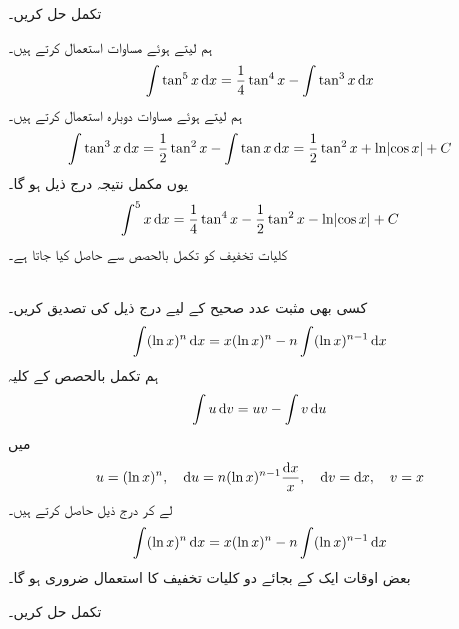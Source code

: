 تکمل  حل کریں۔

ہم  لیتے ہوئے مساوات  استعمال کرتے ہیں۔
\begin{align*}
\int\tan^5x\dif x=\frac{1}{4}\tan^4x-\int\tan^3x\dif x
\end{align*}
ہم  لیتے ہوئے  مساوات  دوبارہ استعمال کرتے ہیں۔
\begin{align*}
\int\tan^3x\dif x=\frac{1}{2}\tan^2x-\int \tan x\dif x=\frac{1}{2}\tan^2x+\ln\abs{\cos x}+C
\end{align*}
یوں مکمل نتیجہ درج ذیل ہو گا۔
\begin{align*}
\int^5x \dif x=\frac{1}{4}\tan^4x-\frac{1}{2}\tan^2x-\ln\abs{\cos x}+C
\end{align*}
کلیات تخفیف کو تکمل بالحصص سے حاصل کیا جاتا ہے۔

\\
کسی بھی مثبت عدد صحیح  کے لیے درج ذیل کی تصدیق کریں۔
\begin{align*}
\int (\ln x)^n\dif x=x(\ln x)^n-n\int (\ln x)^{n-1}\dif x
\end{align*}
ہم تکمل بالحصص کے کلیہ
\begin{align*}
\int u\dif v=uv-\int v\dif u
\end{align*}
میں
\begin{align*}
u=(\ln x)^n,\quad \dif u=n(\ln x)^{n-1}\frac{\dif x}{x},\quad \dif v=\dif x,\quad v=x
\end{align*}
لے کر درج ذیل حاصل کرتے ہیں۔
\begin{align*}
\int (\ln x)^n\dif x=x(\ln x)^n-n\int (\ln x)^{n-1}\dif x
\end{align*}
بعض اوقات ایک کے بجائے دو  کلیات تخفیف کا استعمال ضروری ہو گا۔

تکمل  حل کریں۔

